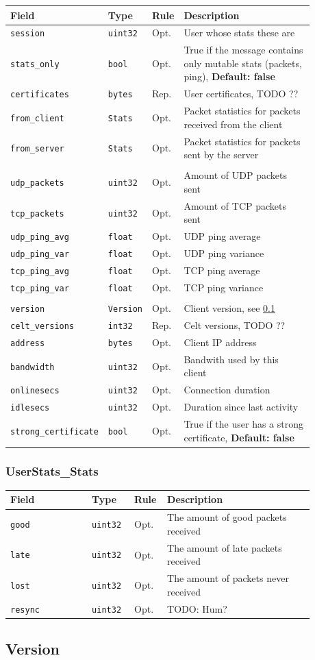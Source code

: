 \documentclass[11pt]{article} %
\newenvironment{mumbleMessageEx}
{%
	\small
	\renewcommand\arraystretch{1.5}
	\begin{tabular}{p{0.25\linewidth}p{0.13\linewidth}p{0.05\linewidth}p{0.45\linewidth}}
	Field & Type & Rule & Description \\
	\hline
}
{%
	\end{tabular}
	\renewcommand\arraystretch{1.0}
}
\newcommand{\mumbleMessageExItem}[4]{ \texttt{#1} & \texttt{#2} & #3 & #4 \\ }
\begin{document}
\begin{mumbleMessageEx}
\mumbleMessageExItem{session}{uint32}{Opt.}{User whose stats these are}
\mumbleMessageExItem{stats\_only}{bool}{Opt.}{True if the message contains only mutable stats (packets, ping), \textbf{Default: false}}
\mumbleMessageExItem{certificates}{bytes}{Rep.}{User certificates, TODO ??}
\mumbleMessageExItem{from\_client}{Stats}{Opt.}{Packet statistics for packets received from the client}
\mumbleMessageExItem{from\_server}{Stats}{Opt.}{Packet statistics for packets sent by the server}
\\
\mumbleMessageExItem{udp\_packets}{uint32}{Opt.}{Amount of UDP packets sent}
\mumbleMessageExItem{tcp\_packets}{uint32}{Opt.}{Amount of TCP packets sent}
\mumbleMessageExItem{udp\_ping\_avg}{float}{Opt.}{UDP ping average}
\mumbleMessageExItem{udp\_ping\_var}{float}{Opt.}{UDP ping variance}
\mumbleMessageExItem{tcp\_ping\_avg}{float}{Opt.}{TCP ping average}
\mumbleMessageExItem{tcp\_ping\_var}{float}{Opt.}{TCP ping variance}
\\
\mumbleMessageExItem{version}{Version}{Opt.}{Client version, see \ref{msg:version}}
\mumbleMessageExItem{celt\_versions}{int32}{Rep.}{Celt versions, TODO ??}
\mumbleMessageExItem{address}{bytes}{Opt.}{Client IP address}
\mumbleMessageExItem{bandwidth}{uint32}{Opt.}{Bandwith used by this client}
\mumbleMessageExItem{onlinesecs}{uint32}{Opt.}{Connection duration}
\mumbleMessageExItem{idlesecs}{uint32}{Opt.}{Duration since last activity}
\mumbleMessageExItem{strong\_certificate}{bool}{Opt.}{True if the user has a strong certificate, \textbf{Default: false}}
\end{mumbleMessageEx}

\subsubsection{UserStats\_Stats}
\label{msg:userStats:stats}

\begin{mumbleMessageEx}
\mumbleMessageExItem{good}{uint32}{Opt.}{The amount of good packets received}
\mumbleMessageExItem{late}{uint32}{Opt.}{The amount of late packets received}
\mumbleMessageExItem{lost}{uint32}{Opt.}{The amount of packets never received}
\mumbleMessageExItem{resync}{uint32}{Opt.}{TODO: Hum?}
\end{mumbleMessageEx}

\subsection{Version}
\label{msg:version}
\end{document}
